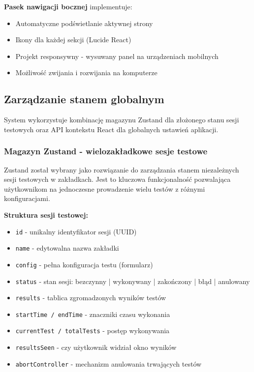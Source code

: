 \documentclass[12pt,a4paper]{article}
\begin{document}
\textbf{Pasek nawigacji bocznej} implementuje:
\begin{itemize}
    \item Automatyczne podświetlanie aktywnej strony
    \item Ikony dla każdej sekcji (Lucide React)
    \item Projekt responsywny - wysuwany panel na urządzeniach mobilnych
    \item Możliwość zwijania i rozwijania na komputerze
\end{itemize}

\subsection{Zarządzanie stanem globalnym}

System wykorzystuje kombinację magazynu Zustand dla złożonego stanu sesji testowych oraz API kontekstu React dla globalnych ustawień aplikacji.

\subsubsection{Magazyn Zustand - wielozakładkowe sesje testowe}

Zustand został wybrany jako rozwiązanie do zarządzania stanem niezależnych sesji testowych w zakładkach. Jest to kluczowa funkcjonalność pozwalająca użytkownikom na jednoczesne prowadzenie wielu testów z różnymi konfiguracjami.

\textbf{Struktura sesji testowej:}
\begin{itemize}
    \item \texttt{id} - unikalny identyfikator sesji (UUID)
    \item \texttt{name} - edytowalna nazwa zakładki
    \item \texttt{config} - pełna konfiguracja testu (formularz)
    \item \texttt{status} - stan sesji: bezczynny | wykonywany | zakończony | błąd | anulowany
    \item \texttt{results} - tablica zgromadzonych wyników testów
    \item \texttt{startTime / endTime} - znaczniki czasu wykonania
    \item \texttt{currentTest / totalTests} - postęp wykonywania
    \item \texttt{resultsSeen} - czy użytkownik widział okno wyników
    \item \texttt{abortController} - mechanizm anulowania trwających testów
\end{itemize}
\end{document}
